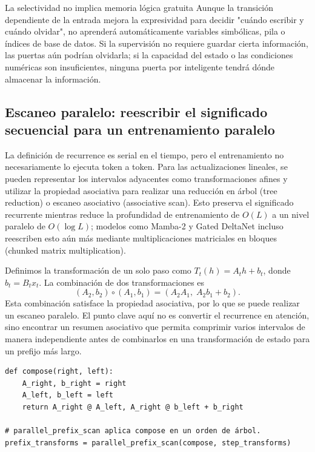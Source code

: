 \begin{warningbox}{La selectividad no implica memoria lógica gratuita}
Aunque la transición dependiente de la entrada mejora la expresividad para decidir "cuándo escribir y cuándo olvidar", no aprenderá automáticamente variables simbólicas, pila o índices de base de datos. Si la supervisión no requiere guardar cierta información, las puertas aún podrían olvidarla; si la capacidad del estado o las condiciones numéricas son insuficientes, ninguna puerta por inteligente tendrá dónde almacenar la información.
\end{warningbox}

\subsection{Escaneo paralelo: reescribir el significado secuencial para un entrenamiento paralelo}

La definición de recurrence es serial en el tiempo, pero el entrenamiento no necesariamente lo ejecuta token a token. Para las actualizaciones lineales, se pueden representar los intervalos adyacentes como transformaciones afines y utilizar la propiedad asociativa para realizar una reducción en árbol (tree reduction) o escaneo asociativo (associative scan). Esto preserva el significado recurrente mientras reduce la profundidad de entrenamiento de $O(L)$ a un nivel paralelo de $O(\log L)$; modelos como Mamba-2 y Gated DeltaNet incluso reescriben esto aún más mediante multiplicaciones matriciales en bloques (chunked matrix multiplication).


Definimos la transformación de un solo paso como $T_t(h)=A_t h+b_t$, donde $b_t=B_t x_t$. La combinación de dos transformaciones es
\[
(A_2,b_2)\circ(A_1,b_1)
=\left(A_2A_1,\;A_2b_1+b_2\right).
\]
Esta combinación satisface la propiedad asociativa, por lo que se puede realizar un escaneo paralelo. El punto clave aquí no es convertir el recurrence en atención, sino encontrar un resumen asociativo que permita comprimir varios intervalos de manera independiente antes de combinarlos en una transformación de estado para un prefijo más largo.

\begin{lstlisting}[caption={Composición asociativa del recurrence afín}]
def compose(right, left):
    A_right, b_right = right
    A_left, b_left = left
    return A_right @ A_left, A_right @ b_left + b_right

# parallel_prefix_scan aplica compose en un orden de árbol.
prefix_transforms = parallel_prefix_scan(compose, step_transforms)
\end{lstlisting}

